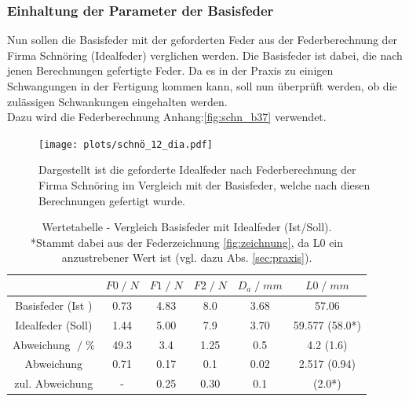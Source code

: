 \subsubsection{Einhaltung der Parameter der Basisfeder}
Nun sollen die Basisfeder mit der geforderten Feder aus der Federberechnung der
Firma Schnöring (Idealfeder) verglichen werden. Die Basisfeder ist dabei, die nach jenen
Berechnungen gefertigte Feder. Da es in der Praxis zu einigen Schwangungen in der
Fertigung kommen kann, soll nun überprüft werden, ob die zulässigen Schwankungen eingehalten werden.\\
Dazu wird die Federberechnung Anhang:\ref{fig:schn_b37} verwendet. 
\begin{figure}[H]
    \center
    \texttt{[image: plots/schnö\_12\_dia.pdf]}
    \caption{Dargestellt ist die geforderte Idealfeder nach Federberechnung der 
            Firma Schnöring im Vergleich mit der Basisfeder, welche nach diesen Berechnungen
            gefertigt wurde.
    }
    \label{fig:qual_basis}
\end{figure}

\begin{table}[H]
    \center
    \begin{tabular}{c |c c c c c}
        \toprule
        & $F0\;/\;N$ & $F1\;/\;N$ & $F2\;/\;N$ & $D_a\;/\;mm$ &$L0\;/\;mm$\\
        \midrule
        Basisfeder (Ist  )&0.73    &4.83   &8.0   &3.68  &57.06\\
        Idealfeder (Soll) &1.44    &5.00   &7.9   &3.70  &59.577 (58.0*)\\
        \midrule
        Abweichung $\;/\;$\% &49.3 &3.4    &1.25  &0.5   &4.2 (1.6) \\
        Abweichung        &0.71    &0.17   &0.1   &0.02  &2.517 (0.94)\\
        zul. Abweichung   &-       &0.25   &0.30  &0.1   &(2.0*)\\
        \bottomrule
    \end{tabular}
    \caption{Wertetabelle - Vergleich Basisfeder mit Idealfeder (Ist/Soll).\\
            *Stammt dabei aus der Federzeichnung \ref{fig:zeichnung}, da L0 ein
            anzustrebener Wert ist (vgl. dazu Abs. \ref{sec:praxis}).
    }
    \label{tab:vergleich}
\end{table}
\label{sec:einhaltung}

